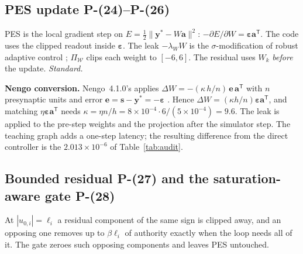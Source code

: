 \documentclass[11pt]{article}
\newcommand{\srcroot}{../..}
\newcommand{\T}{^{\mathsf T}}
\newcommand{\sat}{\operatorname{sat}}
\newcommand{\Peq}[1]{P-(#1)}
\newcommand{\code}[1]{\path{#1}}
\theoremstyle{remark}
\newcommand{\listing}[4]{%
  \Needspace{8\baselineskip}%
  }
\begin{document}
\subsection{PES update \Peq{24}--\Peq{26}}
PES \cite{macneil2011pes,voelker2015pes} is the local gradient step on $E=\frac12\|\bm y^*-W\bm a\|^2$:
$-\partial E/\partial W=\bm\varepsilon\bm a\T$. The code uses the clipped readout inside $\bm\varepsilon$. The leak $-\lambda_WW$ is the
$\sigma$-modification of robust adaptive control \cite{ioannou1984sigma,ioannou1996robust}; $\Pi_{\mathcal W}$ clips each weight
to $[-6,6]$. The residual uses $W_k$ \emph{before} the update. \emph{Standard.}

\textbf{Nengo conversion.} Nengo~4.1.0's \code{SimPES} applies $\Delta W=-(\kappa\,h/n)\,\bm e\,\bm a\T$ with $n$ presynaptic
units and error $\bm e=\bm s-\bm y^*=-\bm\varepsilon$ \cite{bekolay2014nengo}. Hence $\Delta W=(\kappa h/n)\bm\varepsilon\bm a\T$, and
matching $\eta\bm\varepsilon\bm a\T$ needs $\kappa=\eta n/h=8\times10^{-4}\cdot6/(5\times10^{-4})=9.6$. The leak is applied to the
pre-step weights and the projection after the simulator step. The teaching graph adds a one-step latency; the resulting
difference from the direct controller is the $2.013\times10^{-6}$ of Table~\ref{tab:audit}.
\listing{experiments/nengo_nef_replication_2026-08-29/nengo_cmg.py}{191}{214}{PES connection; error $=$ clipped decoded $-$ target}
\listing{experiments/nengo_nef_replication_2026-08-29/nengo_cmg.py}{335}{352}{leak on pre-step weights, projection to $[-6,6]$, residual \Peq{27}}
\listing{src/gra_control/gate.py}{110}{134}{the direct controller: \Peq{16}, \Peq{23}, \Peq{26}, \Peq{27}}

\subsection{Bounded residual \Peq{27} and the saturation-aware gate \Peq{28}}
At $|u_{0,i}|=\ell_i$ a residual component of the same sign is clipped away, and an opposing one removes up to $\beta\ell_i$ of
authority exactly when the loop needs all of it. The gate zeroes such opposing components and leaves PES untouched.
\listing{experiments/final_robustness_gating_2026-09-20/run_final_robustness.py}{370}{378}{requested residual $\beta\bm\ell\odot\bm s$ and its consistency check}
\listing{experiments/final_robustness_gating_2026-09-20/run_final_robustness.py}{380}{395}{gate \Peq{28}, $\bm u_k=\sat_{\bm\ell}(\bm u_0+\beta\bm\ell\odot\tilde{\bm s})$, realized residual}
\listing{experiments/final_robustness_gating_2026-09-20/run_final_robustness.py}{309}{312}{load threshold}
\end{document}
